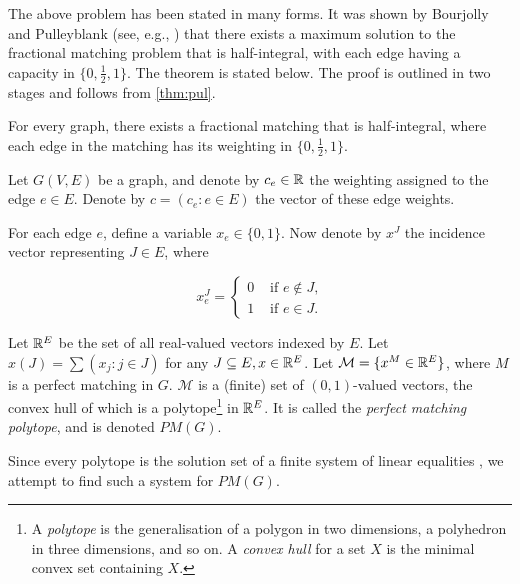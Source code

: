 The above problem has been stated in many forms. It was shown by Bourjolly and Pulleyblank (see, e.g., \cite{bour1989}) that there exists a maximum solution to the fractional matching problem that is half-integral, with each edge having a capacity in $\{0, \frac{1}{2}, 1 \}$. The theorem is stated below. The proof is outlined in two stages and follows from \autoref{thm:pul}.

\begin{theorem}
  For every graph, there exists a fractional matching that is half-integral, where each edge in the matching has its weighting in $\{0, \frac{1}{2}, 1 \}$.
\end{theorem}

Let $G(V, E)$ be a graph, and denote by $c_e \in \mathbb{R}$ the weighting assigned to the edge $e \in E$. Denote by $c = (c_e: e \in E)$ the vector of these edge weights.

For each edge $e$, define a variable $x_e \in \{ 0, 1 \}$. Now denote by $x^J$ the incidence vector representing $J \in E$, where

$$
x_e^J = \left\{ \begin{array}{rl}
 0 &\mbox{ if $e \notin J$,} \\
 1 &\mbox{ if $e \in J$.}
\end{array} \right.
$$

Let $\mathbb{R}^E$ be the set of all real-valued vectors indexed by $E$. Let $x(J) = \sum{ (x_j : j \in J) }$ for any $J \subseteq E, x \in \mathbb{R}^E$. Let $\mathcal{M} = \{ x^M \in \mathbb{R}^E \}$, where $M$ is a perfect matching in $G$. $\mathcal{M}$ is a (finite) set of $(0, 1)$-valued vectors, the convex hull of which is a polytope\footnote{A \emph{polytope} is the generalisation of a polygon in two dimensions, a polyhedron in three dimensions, and so on. A \emph{convex hull} for a set $X$ is the minimal convex set containing $X$.} in $\mathbb{R}^E$. It is called the \emph{perfect matching polytope}, and is denoted $PM(G)$. 

Since every polytope is the solution set of a finite system of linear equalities \cite{weyl1935}, we attempt to find such a system for $PM(G)$.


